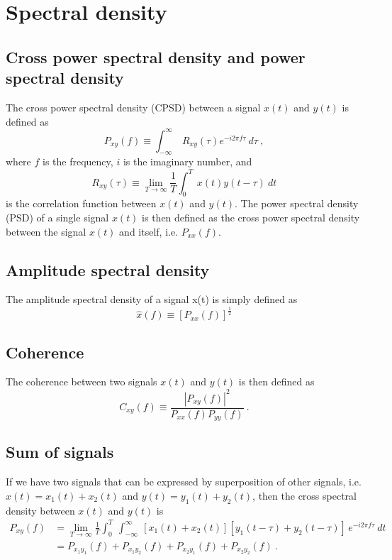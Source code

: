 \section{Spectral density \label{appendix:spectral_density}}

\subsection{Cross power spectral density and power spectral density}
The cross power spectral density (CPSD) between a signal $x(t)$ and $y(t)$ is defined as
\begin{equation}
	P_{xy}(f) \equiv \int_{-\infty}^\infty\ R_{xy}(\tau) e^{-i2\pi f \tau}\ d\tau\ ,
\end{equation}
where $f$ is the frequency, $i$ is the imaginary number, and
\begin{equation}
	R_{xy}(\tau) \equiv \lim_{T\to\infty}\frac{1}{T}\int_0^T\ x(t)y(t-\tau)\ dt
\end{equation}
is the correlation function between $x(t)$ and $y(t)$.
The power spectral density (PSD) of a single signal $x(t)$ is then defined as the cross power spectral density between the signal $x(t)$ and itself, i.e. $P_{xx}(f)$.

\subsection{Amplitude spectral density}
The amplitude spectral density of a signal x(t) is simply defined as
\begin{equation}
	\hat{x}(f) \equiv \left[P_{xx}(f)\right]^{\frac{1}{2}}
\end{equation}

\subsection{Coherence}
The coherence between two signals $x(t)$ and $y(t)$ is then defined as
\begin{equation}
	C_{xy}(f) \equiv \frac{\left\lvert P_{xy}(f)\right\rvert^2}{P_{xx}(f)P_{yy}(f)}\ .
\end{equation}

\subsection{Sum of signals}
If we have two signals that can be expressed by superposition of other signals, i.e. $x(t)=x_1(t)+x_2(t)$ and $y(t)=y_1(t)+y_2(t)$, then the cross spectral density between $x(t)$ and $y(t)$ is
\begin{equation}
	\begin{split}
		P_{xy}(f) &= \lim_{T\to\infty}\frac{1}{T}\int_0^T\ \int_{-\infty}^\infty\  \left[x_1(t)+x_2(t)\right][y_1(t-\tau)+y_2(t-\tau)]\,e^{-i2\pi f\tau}\ dt \\
		&= P_{x_1y_1}(f) + P_{x_1y_2}(f) + P_{x_2y_1}(f) + P_{x_2y_2}(f)\ .
	\end{split} 
\end{equation}
